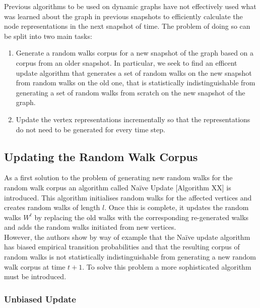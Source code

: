 \documentclass[a4paper]{article}
\begin{document}
Previous algorithms to be used on dynamic graphs have not effectively used what
was learned about the graph in previous snapshots to efficiently calculate the
node representations in the next snapshot of time. The problem of doing so can
be split into two main tasks:

\begin{enumerate}
  \item Generate a random walks corpus for a new snapshot of the graph based on
    a corpus from an older snapshot. In particular,
    we seek to find an efficent update algorithm that generates a set of random
    walks on the new snapshot from random walks on the old one, that is
    statistically indistinguishable from generating a set of random walks from
    scratch on the new snapshot of the graph.
    
  \item  Update the vertex representations incrementally so that the
    representations do not need to be generated for every time step.
    
\end{enumerate}

\subsection{Updating the Random Walk Corpus}

As a first solution to the problem of generating new random walks for the random
walk corpus an algorithm called Naïve Update [Algorithm XX] is introduced. This
algorithm initialises random walks for the affected vertices and creates random
walks of length $l$. Once this is complete, it updates the random walks $W^t$ by
replacing the old walks with the corresponding re-generated walks and adds the
random walks initiated from new vertices.\\

However, the authors show by way of example that the Naïve update algorithm has
biased empirical transition probabilities and that the resulting corpus of
random walks is not statistically indistinguishable from generating a new random
walk corpus at time $t+1$. To solve this problem a more sophisticated algorithm
must be introduced.

\subsubsection{Unbiased Update}
\end{document}
